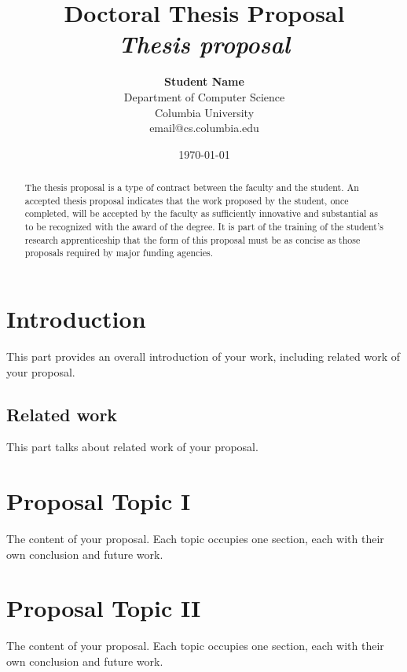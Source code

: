 \documentclass[12pt]{article}
\title{{\bf Doctoral Thesis Proposal} \\
\it Thesis proposal}
\author{ {\bf Student Name}  \\
Department of Computer Science \\
Columbia University\\
{\small email@cs.columbia.edu}
}
\date{\today}
\begin{document}
\pagestyle{plain}
\maketitle

\pagebreak
\begin{abstract}

The thesis proposal is a type of contract between the faculty and the student. 
An accepted thesis proposal indicates that the work proposed by the student, 
once completed, will be accepted by the faculty as sufficiently innovative and 
substantial as to be recognized with the award of the degree. It is part of 
the training of the student's research apprenticeship that the form of this 
proposal must be as concise as those proposals required by major funding 
agencies.

\end{abstract}

\pagebreak
\tableofcontents
\pagebreak

\cleardoublepage
{}

\section{Introduction}
\label{ch:intro}

This part provides an overall introduction of your work, including
related work of your proposal.

\subsection{Related work}
\label{ch:related}

This part talks about related work of your proposal.

\section{Proposal Topic I} \label{sec:topic1}

The content of your proposal. Each topic occupies one section, each
with their own conclusion and future work.

\section{Proposal Topic II} \label{sec:topic2}

The content of your proposal. Each topic occupies one section, each
with their own conclusion and future work.
\end{document}
